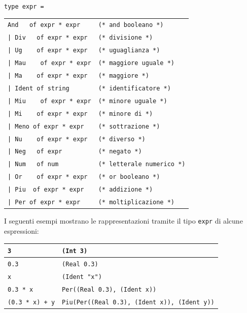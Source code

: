 \documentclass[a4paper,10pt]{article}
\begin{document}
\verb|type expr =|
\begin{center}
\begin{tabular}{l l}
    \verb|And   of expr * expr|	& \verb|(* and booleano *)| \\
    \verb#| Div   of expr * expr# & \verb|(* divisione *)| \\
    \verb#| Ug    of expr * expr#& \verb|(* uguaglianza *)| \\
    \verb#| Mau    of expr * expr#& \verb|(* maggiore uguale *)| \\
    \verb#| Ma    of expr * expr#& \verb|(* maggiore *)| \\
    \verb#| Ident of string#	&\verb|(* identificatore *)| \\
    \verb#| Miu    of expr * expr#&\verb|(* minore uguale *)| \\
    \verb#| Mi    of expr * expr#&\verb|(* minore di *)| \\
    \verb#| Meno of expr * expr#&\verb|(* sottrazione *)| \\
    \verb#| Nu    of expr * expr#&\verb|(* diverso *)| \\
    \verb#| Neg   of expr#	&\verb|(* negato *)|\\
    \verb#| Num   of num#	&\verb|(* letterale numerico *)|\\
    \verb#| Or    of expr * expr#&\verb|(* or booleano *)|\\
    \verb#| Piu  of expr * expr#&\verb|(* addizione *)|\\
    \verb#| Per of expr * expr#&\verb|(* moltiplicazione *)|\\
\end{tabular}
\end{center}

I seguenti esempi mostrano le rappresentazioni tramite il tipo \verb|expr| di
alcune espressioni:\\
\begin{center}
\begin{tabular}{|l|l|}
\hline
\verb|3| & \verb|(Int 3)| \\
\hline
\verb|0.3| & \verb|(Real 0.3)| \\
\hline
\verb|x| & \verb|(Ident "x")| \\
\hline
\verb|0.3 * x| & \verb|Per((Real 0.3), (Ident x))| \\
\hline
\verb|(0.3 * x) + y| &
\verb|Piu(Per((Real 0.3), (Ident x)), (Ident y))| \\
\hline
\end{tabular} 
\end{center}
\end{document}
